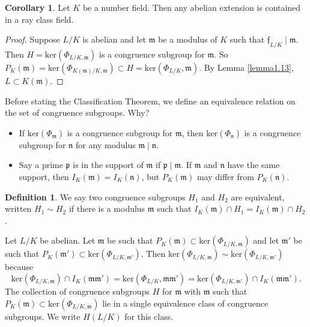 \documentclass{article}
\theoremstyle{definition}
\newtheorem{cor}[theorem]{Corollary}
\newtheorem{defn}{Definition}[section]
\begin{document}
\begin{cor}
    Let $K$ be a number field. Then any abelian extension is contained in a ray class field.
\end{cor}
\begin{proof}
    Suppose $L/K$ is abelian and let $\mathfrak{m}$ be a modulus of $K$ such that $\mathfrak{f}_{L/K} \mid  \mathfrak{m}$. Then $H = \text{ker}(\Phi_{L/K,\mathfrak{m}})$ is a congruence subgroup for $\mathfrak{m}$. So $P_K(\mathfrak{m}) = \text{ker}(\Phi_{K(\mathfrak{m})/K,\mathfrak{m}}) \subset H = \text{ker}(\Phi_{L/K},\mathfrak{m})$. By Lemma \ref{lemma1.13}, $L \subset K(\mathfrak{m})$.
\end{proof}

Before stating the Classification Theorem, we define an equivalence relation on the set of congruence subgroups. Why? 
\begin{itemize}
    \item If $\text{ker}(\Phi_\mathfrak{m})$ is a congruence subgroup for $\mathfrak{m}$, then $\text{ker}(\Phi_{\mathfrak{n}})$ is a congruence subgroup for $\mathfrak{n}$ for any modulus $\mathfrak{m} \mid  \mathfrak{n}$.
    \item Say a prime $\mathfrak{p}$ is in the support of $\mathfrak{m}$ if $\mathfrak{p} \mid \mathfrak{m}$. If $\mathfrak{m}$ and $\mathfrak{n}$ have the same support, then $I_K(\mathfrak{m}) = I_K(\mathfrak{n})$, but $P_K(\mathfrak{m})$ may differ from $P_K(\mathfrak{n})$.
\end{itemize}
\begin{defn}
    We say two congruence subgroups $H_1$ and $H_2$ are equivalent, written $H_1 \sim H_2$ if there is a modulus $\mathfrak{m}$ such that $I_K(\mathfrak{m}) \cap H_1 = I_K(\mathfrak{m}) \cap H_2$.
\end{defn}
Let $L/K$ be abelian. Let $\mathfrak{m}$ be such that $P_K(\mathfrak{m}) \subset \text{ker}(\Phi_{L/K,\mathfrak{m}})$ and let $\mathfrak{m}'$ be such that $P_K(\mathfrak{m}') \subset \text{ker}(\Phi_{L/K,\mathfrak{m}'})$. Then $\text{ker}(\Phi_{L/K,\mathfrak{m}}) \sim \text{ker}(\Phi_{L/K,\mathfrak{m}'})$ because $$\text{ker}(\Phi_{L/K,\mathfrak{m}}) \cap I_K(\mathfrak{m}\mathfrak{m}') = \text{ker}(\Phi_{L/K},\mathfrak{m}\mathfrak{m}') = \text{ker}(\Phi_{L/K,\mathfrak{m}'}) \cap I_K(\mathfrak{m}\mathfrak{m}').$$ 
The collection of congruence subgroups $H$ for $\mathfrak{m}$ with $\mathfrak{m}$ such that $P_K(\mathfrak{m}) \subset \text{ker}(\Phi_{L/K,\mathfrak{m}})$ lie in a single equivalence class of congruence subgroups. We write $H(L/K)$ for this class.
\end{document}
